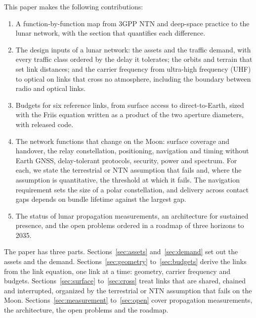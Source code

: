 \documentclass{IEEEoj}
\begin{document}

This paper makes the following contributions:
\begin{enumerate}
\item A function-by-function map from 3GPP NTN and deep-space practice to the lunar network, with the section that quantifies each difference.
\item The design inputs of a lunar network: the assets and the traffic demand, with every traffic class ordered by the delay it tolerates; the orbits and terrain that set link distances; and the carrier frequency from ultra-high frequency (UHF) to optical on links that cross no atmosphere, including the boundary between radio and optical links.
\item Budgets for six reference links, from surface access to direct-to-Earth, sized with the Friis equation written as a product of the two aperture diameters, with released code.
\item The network functions that change on the Moon: surface coverage and handover, the relay constellation, positioning, navigation and timing without Earth GNSS, delay-tolerant protocols, security, power and spectrum. For each, we state the terrestrial or NTN assumption that fails and, where the assumption is quantitative, the threshold at which it fails. The navigation requirement sets the size of a polar constellation, and delivery across contact gaps depends on bundle lifetime against the largest gap.
\item The status of lunar propagation measurements, an architecture for sustained presence, and the open problems ordered in a roadmap of three horizons to 2035.
\end{enumerate}

The paper has three parts. Sections~\ref{sec:assets} and~\ref{sec:demand} set out the assets and the demand. Sections~\ref{sec:geometry} to~\ref{sec:budgets} derive the links from the link equation, one link at a time: geometry, carrier frequency and budgets. Sections~\ref{sec:surface} to~\ref{sec:cross} treat links that are shared, chained and interrupted, organized by the terrestrial or NTN assumption that fails on the Moon. Sections~\ref{sec:measurement} to~\ref{sec:open} cover propagation measurements, the architecture, the open problems and the roadmap.
\end{document}

